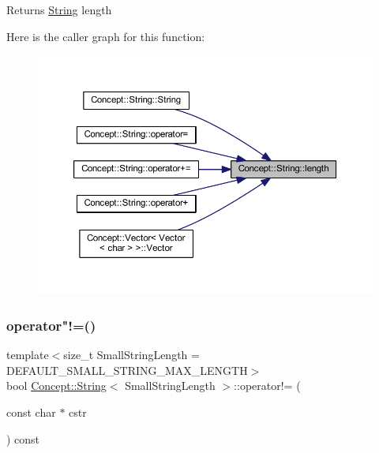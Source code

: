 \begin{DoxyReturn}{Returns}
\mbox{\hyperlink{class_concept_1_1_string}{String}} length 
\end{DoxyReturn}
Here is the caller graph for this function\+:\nopagebreak
\begin{figure}[H]
\begin{center}
\leavevmode
\includegraphics[width=350pt]{class_concept_1_1_string_a21547a1e24398236bdf548eddeac437b_icgraph}
\end{center}
\end{figure}
\mbox{\label{class_concept_1_1_string_ab1fa781b5e29a1e7c2af7523be876515}} 
\subsubsection{\texorpdfstring{operator"!=()}{operator!=()}\hspace{0.1cm}{\footnotesize\ttfamily [1/2]}}
{\footnotesize\ttfamily template$<$size\+\_\+t Small\+String\+Length = D\+E\+F\+A\+U\+L\+T\+\_\+\+S\+M\+A\+L\+L\+\_\+\+S\+T\+R\+I\+N\+G\+\_\+\+M\+A\+X\+\_\+\+L\+E\+N\+G\+TH$>$ \\
bool \mbox{\hyperlink{class_concept_1_1_string}{Concept\+::\+String}}$<$ Small\+String\+Length $>$\+::operator!= (\begin{DoxyParamCaption}\item[{const char $\ast$}]{cstr }\end{DoxyParamCaption}) const\hspace{0.3cm}{\ttfamily [inline]}}

